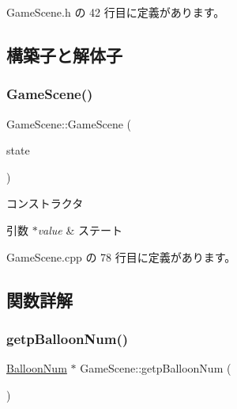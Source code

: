  Game\+Scene.\+h の 42 行目に定義があります。



\subsection{構築子と解体子}
\mbox{\label{class_game_scene_a25e9e82ce85255dac27cd6489751bd40}} 
\subsubsection{\texorpdfstring{Game\+Scene()}{GameScene()}}
{\footnotesize\ttfamily Game\+Scene\+::\+Game\+Scene (\begin{DoxyParamCaption}\item[{\mbox{\hyperlink{class_scene_base_1_1_state_base}{State\+Base}} $\ast$}]{state }\end{DoxyParamCaption})}



コンストラクタ 


\begin{DoxyParams}{引数}
{\em $\ast$value} & ステート \\
\hline
\end{DoxyParams}


 Game\+Scene.\+cpp の 78 行目に定義があります。



\subsection{関数詳解}
\mbox{\label{class_game_scene_a873a5361d2169acbc94298f200d45259}} 
\subsubsection{\texorpdfstring{getp\+Balloon\+Num()}{getpBalloonNum()}}
{\footnotesize\ttfamily \mbox{\hyperlink{class_balloon_num}{Balloon\+Num}} $\ast$ Game\+Scene\+::getp\+Balloon\+Num (\begin{DoxyParamCaption}{ }\end{DoxyParamCaption})}



